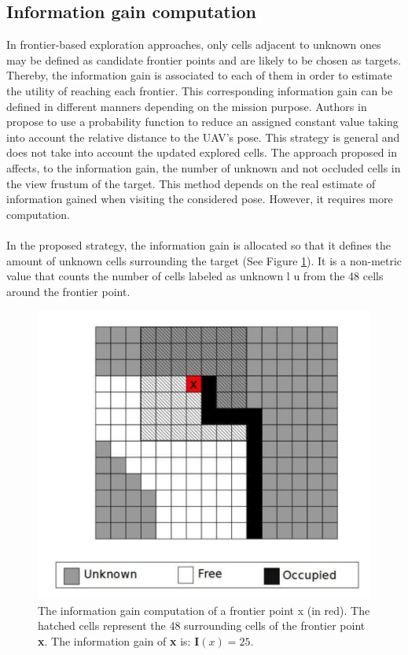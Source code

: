\documentclass[11pt,openany]{book}
\begin{document}
\subsection{Information gain computation}
In frontier-based exploration approaches, only cells adjacent to unknown ones may be defined as candidate frontier points and are likely to be chosen as targets. Thereby, the information gain is associated to each of them in order to estimate the utility of reaching each frontier. This corresponding information gain can be defined in different manners depending on the mission purpose. Authors in \cite{burgard2005coordinated} propose to use a probability function to reduce an assigned constant value taking into account the relative distance to the UAV’s pose. This strategy is general and does not take into account the updated explored cells. The approach proposed in \cite{heng2015efficient} affects, to the information gain, the number of unknown and not occluded cells in the view frustum of the target. This method depends on the real estimate of information gained when visiting the considered pose. However, it requires more computation.\\\\
In the proposed strategy, the information gain is allocated so that it defines the amount of unknown cells surrounding the target (See Figure \ref{fig:3.4}). It is a non-metric value that counts the number of cells labeled as unknown l u from the 48 cells around the frontier point.
\begin{figure}[H]
    \centering
    \includegraphics[scale=0.4]{assets/3_4.png}
    \caption{The information gain computation of a frontier point x (in red). The hatched cells represent the 48 surrounding cells of the frontier point \textbf{x}. The information gain of \textbf{x} is: $\mathbf{I}(x)=25$.}
    \label{fig:3.4}
\end{figure}
\end{document}
